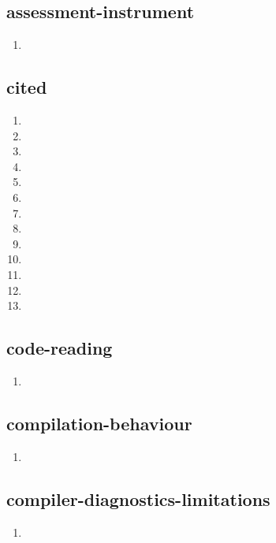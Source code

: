\documentclass{article}
\begin{document}
\subsection{assessment-instrument}
\begin{enumerate}
\item {}
\end{enumerate}

\subsection{cited}
\begin{enumerate}
\item {}
\item {}
\item {}
\item {}
\item {}
\item {}
\item {}
\item {}
\item {}
\item {}
\item {}
\item {}
\item {}
\end{enumerate}

\subsection{code-reading}
\begin{enumerate}
\item {}
\end{enumerate}

\subsection{compilation-behaviour}
\begin{enumerate}
\item {}
\end{enumerate}

\subsection{compiler-diagnostics-limitations}
\begin{enumerate}
\item {}
\end{enumerate}
\end{document}
